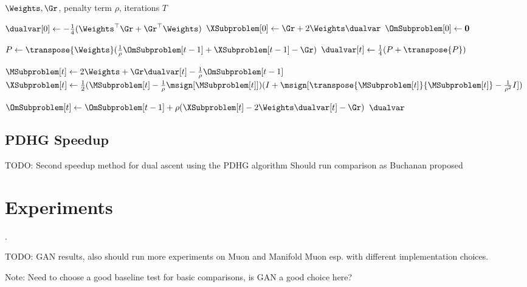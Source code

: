 \documentclass[12pt]{article}
\begin{document}
\begin{algorithm}[t]
\caption{ADMM Dual Solve for Manifold Muon (Dual Ascent Section Only)}\footnotemark
\label{alg:manifold_muon_admm_dual}
\begin{algorithmic}[1]
\Require $\Weights, \Gr$, penalty term $\rho$, iterations $T$ 

\State $\dualvar[0] \gets -\frac14 ({\Weights}^\top \Gr + {\Gr}^\top \Weights)$
\State $\XSubproblem[0] \gets \Gr + 2 \Weights \dualvar$
\State $\OmSubproblem[0] \gets \mathbf{0}$

    \State $P \gets \transpose{\Weights} (\frac{1}{\rho}\OmSubproblem[t-1] + \XSubproblem[t-1] - \Gr)$
    \State $\dualvar[t]\gets \frac14 (P + \transpose{P})$

    \State $\MSubproblem[t] \gets 2\Weights + \Gr \dualvar[t] - \frac{1}{\rho}\OmSubproblem[t-1]$
    \State $\XSubproblem[t] \gets \frac12 (\MSubproblem[t] - \frac{1}{\rho}\msign[\MSubproblem[t]])(I + \msign[\transpose{\MSubproblem[t]}{\MSubproblem[t]}- \frac{1}{\rho^2}I])$

    \State $\OmSubproblem[t] \gets \OmSubproblem[t-1] + \rho(\XSubproblem[t] - 2\Weights \dualvar[t] - \Gr)$
\EndFor
\State \Return $\dualvar$
\end{algorithmic}
\end{algorithm}

\subsection{PDHG Speedup}

TODO: Second speedup method for dual ascent using the PDHG algorithm \cite{cesista2025steepestdescentfinsler} Should run comparison as Buchanan proposed

\clearpage

\section{Experiments}

. 

TODO: GAN results, also should run more experiments on Muon and Manifold Muon esp. with different implementation choices. 

Note: Need to choose a good baseline test for basic comparisons, is GAN a good choice here?
\end{document}
